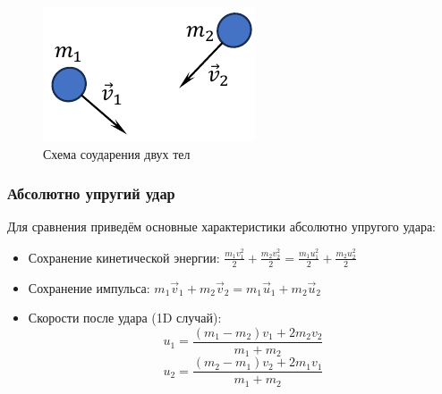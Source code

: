\begin{figure}[H]
	\centering
	\includegraphics[width=0.5\linewidth]{image/Удар}
	\caption{Схема соударения двух тел}
	\label{fig:collision}
\end{figure}

\subsubsection*{Абсолютно упругий удар}

Для сравнения приведём основные характеристики абсолютно упругого удара:

\begin{itemize}
	\item Сохранение кинетической энергии: $\frac{m_1 v_1^2}{2} + \frac{m_2 v_2^2}{2} = \frac{m_1 u_1^2}{2} + \frac{m_2 u_2^2}{2}$
	\item Сохранение импульса: $m_1\vec{v}_1 + m_2\vec{v}_2 = m_1\vec{u}_1 + m_2\vec{u}_2$
	\item Скорости после удара (1D случай):
	\[ u_1 = \frac{(m_1 - m_2)v_1 + 2m_2 v_2}{m_1 + m_2} \]
	\[ u_2 = \frac{(m_2 - m_1)v_2 + 2m_1 v_1}{m_1 + m_2} \]
\end{itemize}